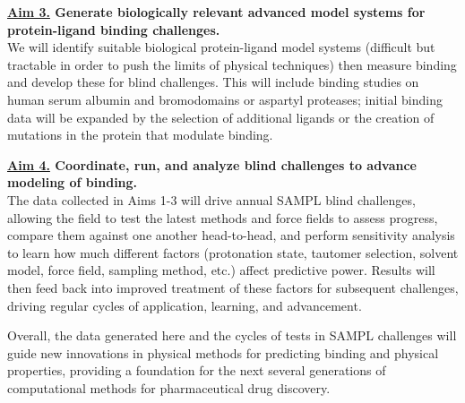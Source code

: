 \documentclass[11pt]{article}
\begin{document}
{\bf \underline{Aim 3.} Generate biologically relevant advanced model systems for protein-ligand binding challenges.}\\
We will identify suitable biological protein-ligand model systems (difficult but tractable in order to push the limits of physical techniques) then measure binding and develop these for blind challenges. 
This will include binding studies on human serum albumin and bromodomains or aspartyl proteases; initial binding data will be expanded by the selection of additional ligands or the creation of mutations in the protein that modulate binding.

{\bf \underline{Aim 4.} Coordinate, run, and analyze blind challenges to advance modeling of binding.} \\
The data collected in Aims 1-3 will drive annual SAMPL blind challenges, allowing the field to test the latest methods and force fields to assess progress, compare them against one another head-to-head, and perform sensitivity analysis to learn how much different factors (protonation state, tautomer selection, solvent model, force field, sampling method, etc.) affect predictive power. 
Results will then feed back into improved treatment of these factors for subsequent challenges, driving regular cycles of application, learning, and advancement.

Overall, the data generated here and the cycles of tests in SAMPL challenges will guide new innovations in physical methods for predicting binding and physical properties, providing a foundation for the next several generations of computational methods for pharmaceutical drug discovery. 
\end{document}

